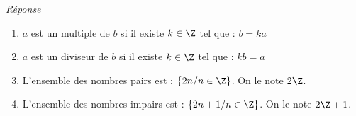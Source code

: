 \textit{Réponse}

\begin{enumerate}
	\item $a$ est un multiple de $b$ si il existe $k \in \Z$ tel que : $b = ka$
	\item $a$ est un diviseur de $b$ si il existe $k \in \Z$ tel que : $kb = a$
	\item L'ensemble des nombres pairs est : $\left\lbrace 2n / n\in \Z \right\rbrace$. On le note $2\Z$.
	\item L'ensemble des nombres impairs est : $\left\lbrace 2n + 1 /n\in \Z \right\rbrace$. On le note $2\Z + 1 $.
\end{enumerate}